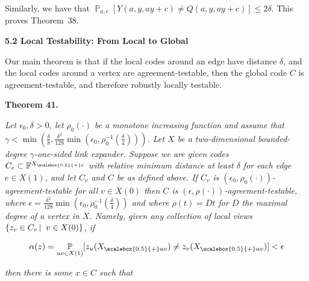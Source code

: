 Similarly, we have that $\operatorname*{\mathbb{P}}_{a,c}[Y(a,y,ay+c)\not=Q(a,y,ay+c)]\leq 2\delta$. This proves Theorem 38.\par






\par\medskip\noindent\textbf{
5.2 Local Testability: From Local to Global}\par




Our main theorem is that if the local codes around an edge have distance $\delta$, and the local codes around a vertex are agreement-testable, then the global code $C$ is agreement-testable, and therefore robustly locally testable.\par





\par\medskip\noindent\textbf{
\textbf{Theorem 41}\textbf{.}
}\par



\emph{Let $\epsilon_{0},\delta>0$, let $\rho_{0}(\cdot)$ be a monotone increasing function and assume that $\gamma<\min(\frac{\delta}{8},\frac{\delta^{2}}{128}\min(\epsilon_{0},\rho_{0}^{-1}(\frac{\delta}{4})))$.
Let $X$ be a two-dimensional bounded-degree $\gamma$-one-sided link expander.
Suppose we are given codes $C_{e}\subset\mathbb{F}^{{X}_{\scalebox{0.5}{+}e}}$ with relative minimum distance at least $\delta$ for each edge $e\in X(1)$, and let $C_{v}$ and $C$ be as defined above.
If $C_{v}$ is $(\epsilon_{0},\rho_{0}(\cdot))$-agreement-testable for all $v\in X(0)$ then $C$ is $(\epsilon,\rho(\cdot))$-agreement-testable, where
$\epsilon=\frac{\delta^{2}}{128}\min(\epsilon_{0},\rho_{0}^{-1}(\frac{\delta}{4}))$ and where $\rho(t)=Dt$ for $D$ the maximal degree of a vertex in $X$. Namely, given any collection of local views $\left\{z_{v}\in C_{v}\left|\;\vphantom{z_{v}\in C_{v}v\in X(0)}\right.v\in X(0)\right\}$, if}\par


\[\begin{gathered}
\alpha(z)=\operatorname*{\mathbb{P}}_{uv\in X(1)}[z_{u}({X}_{\scalebox{0.5}{+}uv})\neq z_{v}({X}_{\scalebox{0.5}{+}uv})]<\epsilon
\end{gathered}\]


\emph{then there is some $x\in C$ such that}\par



